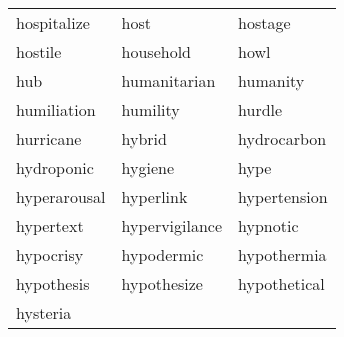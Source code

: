 \documentclass{minimal}
\begin{document}
\begin{longtable}{p{2.8cm}p{2.8cm}p{2.8cm}}
hospitalize & host & hostage \\
hostile & household & howl \\
hub & humanitarian & humanity \\
humiliation & humility & hurdle \\
hurricane & hybrid & hydrocarbon \\
hydroponic & hygiene & hype \\
hyperarousal & hyperlink & hypertension \\
hypertext & hypervigilance & hypnotic \\
hypocrisy & hypodermic & hypothermia \\
hypothesis & hypothesize & hypothetical \\
hysteria
\end{longtable}
\end{document}

